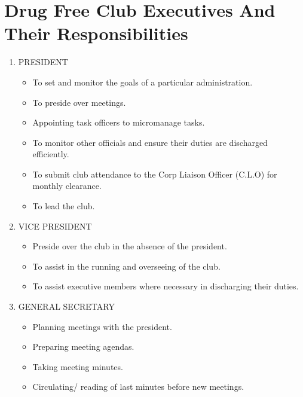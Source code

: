 \documentclass{report}
\begin{document}
\section{Drug Free Club Executives And Their Responsibilities}
\begin{enumerate}
    \item PRESIDENT
        \begin{itemize}
    \item 
    To set and monitor the goals of a particular administration.
    
    \item 
    To preside over meetings.
    
    \item 
    Appointing task officers to micromanage tasks.

    \item 
    To monitor other officials and ensure their duties are discharged efficiently.
    
    \item 
    To submit club attendance to the Corp Liaison Officer (C.L.O) for monthly clearance.
    
    \item 
    To lead the club.
\end{itemize}

    \item VICE PRESIDENT
        \begin{itemize}
    \item 
    Preside over the club in the absence of the president.

    \item 
    To assist in the running and overseeing of the club.
    
    \item 
    To assist executive members where necessary in discharging their duties.
\end{itemize}
    \item GENERAL SECRETARY
        \begin{itemize}
    \item 
    Planning meetings with the president.
    
    \item 
    Preparing meeting agendas.
    
    \item 
    Taking meeting minutes.

    \item 
    Circulating/ reading of last minutes before new meetings.
    

\end{itemize}
\end{enumerate}
\end{document}
